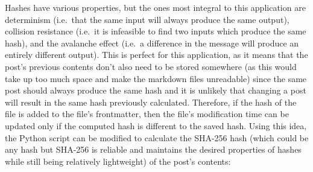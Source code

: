 Hashes have various properties, but the ones most integral to this
application are determinism (i.e.~that the same input will always
produce the same output), collision resistance (i.e.~it is infeasible to
find two inputs which produce the same hash), and the avalanche effect
(i.e.~a difference in the message will produce an entirely different
output). This is perfect for this application, as it means that the
post's previous contents don't also need to be stored somewhere (as this
would take up too much space and make the markdown files unreadable)
since the same post should always produce the same hash and it is
unlikely that changing a post will result in the same hash previously
calculated. Therefore, if the hash of the file is added to the file's
frontmatter, then the file's modification time can be updated only if
the computed hash is different to the saved hash. Using this idea, the
Python script can be modified to calculate the SHA-256 hash (which could
be any hash but SHA-256 is reliable and maintains the desired properties
of hashes while still being relatively lightweight) of the post's
contents:

